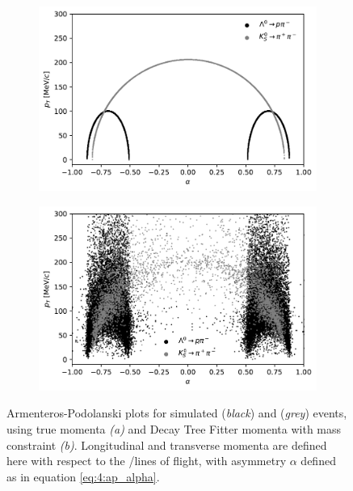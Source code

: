 \begin{figure}[t]
	\centering
	\begin{subfigure}{.45\textwidth}
		\includegraphics[height=.2\textheight]{graphics/04-event_selection/MCTRUTH_armenteros_podolanski_MC_scatter.pdf}
		\caption{}
		\label{fig:4:ap_plots_truth}
	\end{subfigure}
	\begin{subfigure}{.45\textwidth}
		\includegraphics[height=.2\textheight]{graphics/04-event_selection/DTF_FixJPsi_armenteros_podolanski_MC_scatter.pdf}
		\caption{}
		\label{fig:4:ap_plots_dtf}
	\end{subfigure}
	\caption{Armenteros-Podolanski plots for simulated \demonstratorshort (\textit{black}) and \physbkgshort (\textit{grey}) events, using true momenta \textit{(a)} and Decay Tree Fitter momenta with \jpsi mass constraint \textit{(b)}. Longitudinal \pl and transverse \pt momenta are defined here with respect to the \lz/\kshort lines of flight, with \pl asymmetry $\alpha$ defined as in equation \eqref{eq:4:ap_alpha}.}
	\label{fig:4:ap_plots_mc}
\end{figure}

